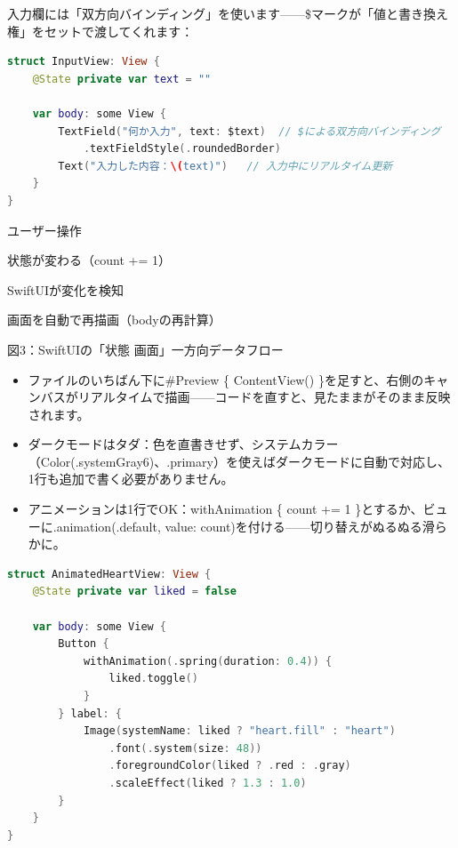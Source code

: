 入力欄には「双方向バインディング」を使います——\$マークが「値と書き換え権」をセットで渡してくれます：

\begin{lstlisting}[language=Swift]
struct InputView: View {
    @State private var text = ""

    var body: some View {
        TextField("何か入力", text: $text)  // $による双方向バインディング
            .textFieldStyle(.roundedBorder)
        Text("入力した内容：\(text)")   // 入力中にリアルタイム更新
    }
}
\end{lstlisting}

ユーザー操作

状態が変わる（count += 1）

SwiftUIが変化を検知

画面を自動で再描画（bodyの再計算）

\begin{center}\small\color{gray}図3：SwiftUIの「状態 画面」一方向データフロー\end{center}


\begin{itemize}
  \item ファイルのいちばん下に\#Preview \{ ContentView() \}を足すと、右側のキャンバスがリアルタイムで描画——コードを直すと、見たままがそのまま反映されます。
  \item ダークモードはタダ：色を直書きせず、システムカラー（Color(.systemGray6)、.primary）を使えばダークモードに自動で対応し、1行も追加で書く必要がありません。
  \item アニメーションは1行でOK：withAnimation \{ count += 1 \}とするか、ビューに.animation(.default, value: count)を付ける——切り替えがぬるぬる滑らかに。
\end{itemize}

\begin{lstlisting}[language=Swift]
struct AnimatedHeartView: View {
    @State private var liked = false

    var body: some View {
        Button {
            withAnimation(.spring(duration: 0.4)) {
                liked.toggle()
            }
        } label: {
            Image(systemName: liked ? "heart.fill" : "heart")
                .font(.system(size: 48))
                .foregroundColor(liked ? .red : .gray)
                .scaleEffect(liked ? 1.3 : 1.0)
        }
    }
}
\end{lstlisting}

